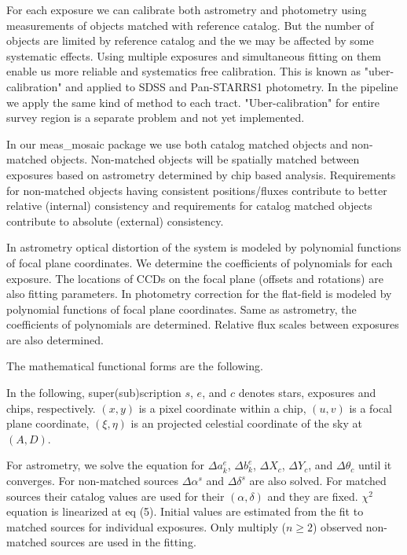 \documentclass[12pt]{article}
\begin{document}
For each exposure we can calibrate both astrometry and photometry using measurements of objects
matched with reference catalog. But the number of objects are limited by reference catalog and
the we may be affected by some systematic effects. Using multiple exposures and simultaneous fitting
on them enable us more reliable and systematics free calibration. This is known as "uber-calibration" and
applied to SDSS and Pan-STARRS1 photometry. In the pipeline we apply the same kind of method
to each tract. "Uber-calibration" for entire survey region is a separate problem and not yet implemented.

In our meas\_mosaic package we use both catalog matched objects and non-matched objects.
Non-matched objects will be spatially matched between exposures based on astrometry determined 
by chip based analysis. Requirements for non-matched objects having consistent positions/fluxes
contribute to better relative (internal) consistency and requirements for catalog matched objects 
contribute to absolute (external) consistency. 

In astrometry optical distortion of the system is modeled by polynomial functions of focal plane coordinates.
We determine the coefficients of polynomials for each exposure. The locations of CCDs on the focal plane
(offsets and rotations) are also fitting parameters.
In photometry correction for the flat-field is modeled by polynomial functions of focal plane coordinates.
Same as astrometry, the coefficients of polynomials are determined. Relative flux scales between exposures
are also determined.

The mathematical functional forms are the following.

In the following, super(sub)scription $s$, $e$, and $c$ denotes stars, exposures and chips, respectively.
$(x,y)$ is a pixel coordinate within a chip, $(u,v)$ is a focal plane coordinate, $(\xi,\eta)$ is an projected
celestial coordinate of the sky at $(A,D)$.

For astrometry, we solve the equation for $\Delta a_k^e$, $\Delta b_k^e$, $\Delta X_c$, $\Delta Y_c$, and
$\Delta\theta_c$ until it converges. For non-matched sources $\Delta\alpha^s$ and $\Delta\delta^s$ are also
solved.  For matched sources their catalog values are used for their $(\alpha, \delta)$ and they are fixed.
$\chi^2$ equation is linearized at eq (5). Initial values are estimated from the fit to matched sources for
individual exposures. Only multiply ($n\ge2$) observed non-matched sources are used in the fitting.
\end{document}
